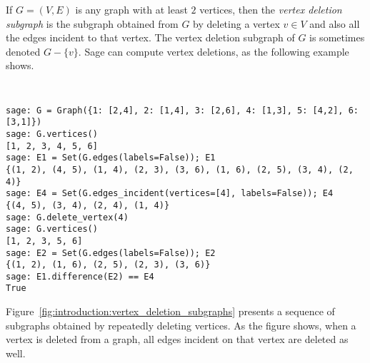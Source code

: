 If $G = (V,E)$ is any graph with at least $2$ vertices, then the
\emph{vertex deletion subgraph} is the subgraph obtained from $G$ by
deleting a vertex $v \in V$ and also all the edges incident to that
vertex. The vertex deletion subgraph of $G$ is sometimes denoted
$G - \{v\}$.
Sage can compute vertex deletions, as the following example shows.
%
\begin{center}
\fontsize{9pt}{9pt}
\selectfont
\tt
\begin{lstlisting}
sage: G = Graph({1: [2,4], 2: [1,4], 3: [2,6], 4: [1,3], 5: [4,2], 6: [3,1]})
sage: G.vertices()
[1, 2, 3, 4, 5, 6]
sage: E1 = Set(G.edges(labels=False)); E1
{(1, 2), (4, 5), (1, 4), (2, 3), (3, 6), (1, 6), (2, 5), (3, 4), (2, 4)}
sage: E4 = Set(G.edges_incident(vertices=[4], labels=False)); E4
{(4, 5), (3, 4), (2, 4), (1, 4)}
sage: G.delete_vertex(4)
sage: G.vertices()
[1, 2, 3, 5, 6]
sage: E2 = Set(G.edges(labels=False)); E2
{(1, 2), (1, 6), (2, 5), (2, 3), (3, 6)}
sage: E1.difference(E2) == E4
True
\end{lstlisting}
\end{center}
%
Figure~\ref{fig:introduction:vertex_deletion_subgraphs}
presents a sequence of subgraphs obtained by repeatedly deleting
vertices. As the figure shows, when a vertex is deleted from a graph,
all edges incident on that vertex are deleted as well.

